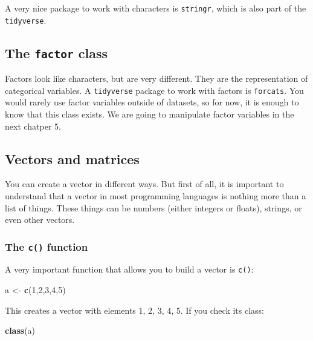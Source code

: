 \documentclass[]{gitbook}
\newenvironment{Shaded}{\begin{snugshade}}{\end{snugshade}}
\newcommand{\DecValTok}[1]{\textcolor[rgb]{0.00,0.00,0.81}{#1}}
\newcommand{\KeywordTok}[1]{\textcolor[rgb]{0.13,0.29,0.53}{\textbf{#1}}}
\newcommand{\NormalTok}[1]{#1}
\newcommand{\StringTok}[1]{\textcolor[rgb]{0.31,0.60,0.02}{#1}}
\theoremstyle{definition}
\theoremstyle{definition}
\theoremstyle{definition}
\theoremstyle{remark}
\begin{document}
A very nice package to work with characters is \texttt{stringr}, which
is also part of the \texttt{tidyverse}.

\hypertarget{the-factor-class}{%
\subsection{\texorpdfstring{The \texttt{factor}
class}{The factor class}}\label{the-factor-class}}

Factors look like characters, but are very different. They are the
representation of categorical variables. A \texttt{tidyverse} package to
work with factors is \texttt{forcats}. You would rarely use factor
variables outside of datasets, so for now, it is enough to know that
this class exists. We are going to manipulate factor variables in the
next chatper 5.

\hypertarget{vectors-and-matrices}{%
\subsection{Vectors and matrices}\label{vectors-and-matrices}}

You can create a vector in different ways. But first of all, it is
important to understand that a vector in most programming languages is
nothing more than a list of things. These things can be numbers (either
integers or floats), strings, or even other vectors.

\hypertarget{the-c-function}{%
\subsubsection{\texorpdfstring{The \texttt{c()}
function}{The c() function}}\label{the-c-function}}

A very important function that allows you to build a vector is
\texttt{c()}:

\begin{Shaded}
\begin{Highlighting}[]
\NormalTok{a <-}\StringTok{ }\KeywordTok{c}\NormalTok{(}\DecValTok{1}\NormalTok{,}\DecValTok{2}\NormalTok{,}\DecValTok{3}\NormalTok{,}\DecValTok{4}\NormalTok{,}\DecValTok{5}\NormalTok{)}
\end{Highlighting}
\end{Shaded}

This creates a vector with elements 1, 2, 3, 4, 5. If you check its
class:

\begin{Shaded}
\begin{Highlighting}[]
\KeywordTok{class}\NormalTok{(a)}
\end{Highlighting}
\end{Shaded}
\end{document}
